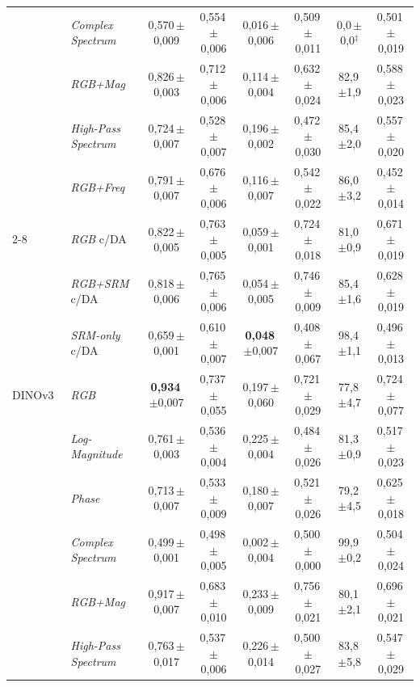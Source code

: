 \documentclass[10pt,conference]{IEEEtran}
\newcommand{\pmsd}[2]{#1\,{\scriptsize$\pm$#2}}
\begin{document}
\begin{table}[!t]
\begin{tabular}{@{}ll ccc ccc@{}}
 & \textit{Complex Spectrum} & \pmsd{0,570}{0,009} & \pmsd{0,554}{0,006} & \pmsd{0,016}{0,006} & \pmsd{0,509}{0,011} & \pmsd{0,0}{0,0}$^\ddagger$ & \pmsd{0,501}{0,019} \\
 & \textit{RGB+Mag} & \pmsd{0,826}{0,003} & \pmsd{0,712}{0,006} & \pmsd{0,114}{0,004} & \pmsd{0,632}{0,024} & \pmsd{82,9}{1,9} & \pmsd{0,588}{0,023} \\
 & \textit{High-Pass Spectrum} & \pmsd{0,724}{0,007} & \pmsd{0,528}{0,007} & \pmsd{0,196}{0,002} & \pmsd{0,472}{0,030} & \pmsd{85,4}{2,0} & \pmsd{0,557}{0,020} \\
 & \textit{RGB+Freq} & \pmsd{0,791}{0,007} & \pmsd{0,676}{0,006} & \pmsd{0,116}{0,007} & \pmsd{0,542}{0,022} & \pmsd{86,0}{3,2} & \pmsd{0,452}{0,014} \\
 \cmidrule(l){2-8}
 & \textit{RGB} c/DA & \pmsd{0,822}{0,005} & \pmsd{0,763}{0,005} & \pmsd{0,059}{0,001} & \pmsd{0,724}{0,018} & \pmsd{81,0}{0,9} & \pmsd{0,671}{0,019} \\
 & \textit{RGB+SRM} c/DA & \pmsd{0,818}{0,006} & \pmsd{0,765}{0,006} & \pmsd{0,054}{0,005} & \pmsd{0,746}{0,009} & \pmsd{85,4}{1,6} & \pmsd{0,628}{0,019} \\
 & \textit{SRM-only} c/DA & \pmsd{0,659}{0,001} & \pmsd{0,610}{0,007} & \pmsd{\textbf{0,048}}{0,007} & \pmsd{0,408}{0,067} & \pmsd{98,4}{1,1} & \pmsd{0,496}{0,013} \\
\midrule
DINOv3~\cite{simeoni2025dinov3} & \textit{RGB} & \pmsd{\textbf{0,934}}{0,007} & \pmsd{0,737}{0,055} & \pmsd{0,197}{0,060} & \pmsd{0,721}{0,029} & \pmsd{77,8}{4,7} & \pmsd{0,724}{0,077} \\
 & \textit{Log-Magnitude} & \pmsd{0,761}{0,003} & \pmsd{0,536}{0,004} & \pmsd{0,225}{0,004} & \pmsd{0,484}{0,026} & \pmsd{81,3}{0,9} & \pmsd{0,517}{0,023} \\
 & \textit{Phase} & \pmsd{0,713}{0,007} & \pmsd{0,533}{0,009} & \pmsd{0,180}{0,007} & \pmsd{0,521}{0,026} & \pmsd{79,2}{4,5} & \pmsd{0,625}{0,018} \\
 & \textit{Complex Spectrum} & \pmsd{0,499}{0,001} & \pmsd{0,498}{0,005} & \pmsd{0,002}{0,004} & \pmsd{0,500}{0,000} & \pmsd{99,9}{0,2} & \pmsd{0,504}{0,024} \\
 & \textit{RGB+Mag} & \pmsd{0,917}{0,007} & \pmsd{0,683}{0,010} & \pmsd{0,233}{0,009} & \pmsd{0,756}{0,021} & \pmsd{80,1}{2,1} & \pmsd{0,696}{0,021} \\
 & \textit{High-Pass Spectrum} & \pmsd{0,763}{0,017} & \pmsd{0,537}{0,006} & \pmsd{0,226}{0,014} & \pmsd{0,500}{0,027} & \pmsd{83,8}{5,8} & \pmsd{0,547}{0,029} \\

\end{tabular}
\end{table}
\end{document}
